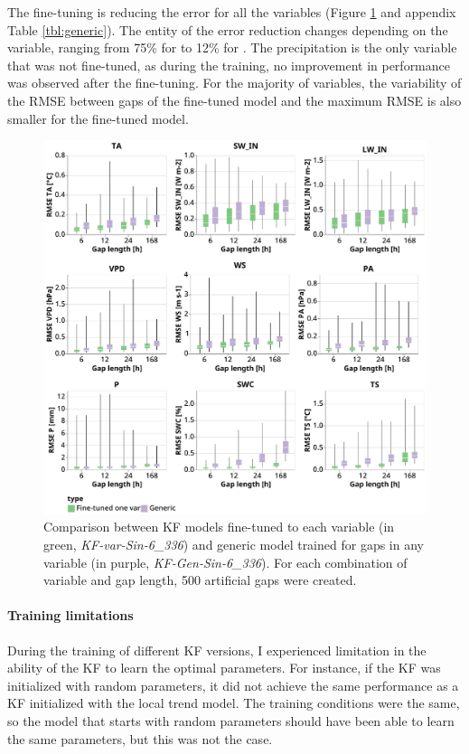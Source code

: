 \documentclass{article}
\newcommand{\imgwidth}{6in}
\begin{document}
The fine-tuning is reducing the error for all the variables (Figure \ref{fig:generic} and appendix Table \ref{tbl:generic}). The entity of the error reduction changes depending on the variable, ranging from 75\% for  to 12\% for .
The precipitation is the only variable that was not fine-tuned, as during the training, no improvement in performance was observed after the fine-tuning.
For the majority of variables, the variability of the RMSE between gaps of the fine-tuned model and the maximum RMSE is also smaller for the fine-tuned model.

\begin{figure}
\centerline{\includegraphics[width=\imgwidth]{generic}}
\caption{Comparison between KF models fine-tuned to each variable (in green, \textit{KF-\textlangle var\textrangle-Sin-6\_336}) and generic model trained for gaps in any variable (in purple, \textit{KF-Gen-Sin-6\_336}). For each combination of variable and gap length, 500 artificial gaps were created.}
\label{fig:generic}
\end{figure}

\paragraph{Training limitations} During the training of different KF versions, I experienced limitation in the ability of the KF to learn the optimal parameters. For instance, if the KF was initialized with random parameters, it did not achieve the same performance as a KF initialized with the local trend model. The training conditions were the same, so the model that starts with random parameters should have been able to learn the same parameters, but this was not the case.
\end{document}
